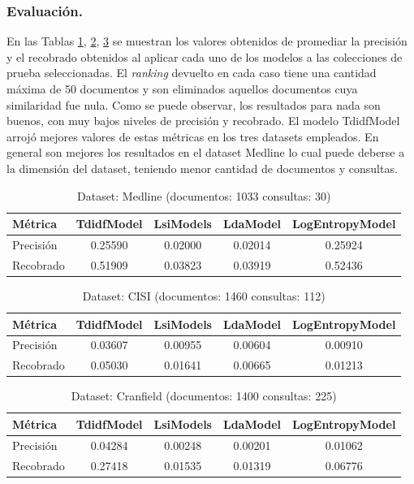 \documentclass{llncs}
\begin{document}
\subsubsection{Evaluación.} 
En las Tablas \ref{medline}, \ref{cisi}, \ref{cran} se muestran los valores obtenidos de promediar la precisión y el recobrado obtenidos al aplicar cada uno de los modelos a las colecciones de prueba seleccionadas. El \textit{ranking} devuelto en cada caso tiene una cantidad máxima de 50 documentos y son eliminados aquellos documentos cuya similaridad fue nula. Como se puede observar, los resultados para nada son buenos, con muy bajos niveles de precisión y recobrado. El modelo TdidfModel arrojó mejores valores de estas métricas en los tres datasets empleados. En general son mejores los resultados en el dataset Medline lo cual puede deberse a la dimensión del dataset, teniendo menor cantidad de documentos y consultas.

\begin{table}
	\caption{Dataset: Medline (documentos: 1033 consultas: 30)}
	\label{medline} 
	\begin{tabular}{|l|c|c|c|c|}
		\hline
		\textbf{Métrica} & \textbf{TdidfModel} & \textbf{LsiModels} & \textbf{LdaModel} &  \textbf{LogEntropyModel} \\
		\hline
		Precisión & 0.25590 & 0.02000 & 0.02014 & 0.25924 \\
		\hline
		Recobrado & 0.51909 & 0.03823 & 0.03919 & 0.52436 \\
		\hline
	\end{tabular} 
\end{table}

\begin{table}
	\caption{Dataset: CISI (documentos: 1460 consultas: 112)}
	\label{cisi}
	\begin{tabular}{|l|c|c|c|c|}
		\hline
		\textbf{Métrica} & \textbf{TdidfModel} & \textbf{LsiModels} & \textbf{LdaModel} &  \textbf{LogEntropyModel} \\
		\hline		
		Precisión & 0.03607 & 0.00955 & 0.00604 & 0.00910 \\
		\hline
		Recobrado & 0.05030 & 0.01641 & 0.00665 & 0.01213 \\
		\hline
	\end{tabular} 
\end{table}

\begin{table}
	\caption{Dataset: Cranfield (documentos: 1400 consultas: 225)}
	\label{cran}
	\begin{tabular}{|l|c|c|c|c|}
		\hline
		\textbf{Métrica} & \textbf{TdidfModel} & \textbf{LsiModels} & \textbf{LdaModel} &  \textbf{LogEntropyModel} \\
		\hline
		Precisión & 0.04284 & 0.00248 & 0.00201 & 0.01062 \\
		\hline
		Recobrado & 0.27418 & 0.01535 & 0.01319 & 0.06776 \\
		\hline
	\end{tabular} 
\end{table}
\end{document}
